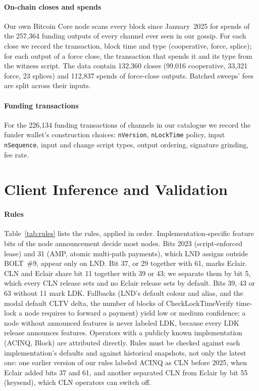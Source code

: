 \documentclass[conference]{IEEEtran}
\begin{document}
\paragraph*{On-chain closes and spends}
Our own Bitcoin Core node scans every block since January~2025 for spends of the 257,364 funding outputs of every
channel ever seen in our gossip. For each close we record the transaction, block time and type (cooperative, force,
splice); for each output of a force close, the transaction that spends it and its type from the witness script. The
data contain 132,360 closes (99,016 cooperative, 33,321 force, 23 splices) and 112,837 spends of force-close
outputs. Batched sweeps' fees are split across their inputs.

\paragraph*{Funding transactions}
For the 226,134 funding transactions of channels in our catalogue we record the funder wallet's construction
choices: \texttt{nVersion}, \texttt{nLockTime} policy, input \texttt{nSequence}, input and change script types,
output ordering, signature grinding, fee rate.

\section{Client Inference and Validation}
\label{sec:inference}

\paragraph*{Rules}
Table~\ref{tab:rules} lists the rules, applied in order. Implementation-specific feature bits of the node
announcement decide most nodes. Bits 2023 (script-enforced lease) and 31 (AMP, atomic multi-path payments), which LND
assigns outside BOLT~\#9, appear only on LND. Bit 37, or 29 together with 61, marks Eclair. CLN and Eclair share bit
11 together with 39 or 43; we separate them by bit 5, which every CLN release sets and no Eclair release sets by
default. Bits 39, 43 or 63 without 11 mark LDK. Fallbacks (LND's default colour and alias, and the modal default CLTV
delta, the number of blocks of CheckLockTimeVerify time-lock a node requires to forward a payment) yield low or
medium confidence; a node without announced features is never labeled LDK, because every LDK release announces
features. Operators with a publicly known implementation (ACINQ, Block) are attributed directly. Rules must be checked
against each implementation's defaults and against historical snapshots, not only the latest one: one earlier version
of our rules labeled ACINQ as CLN before 2025, when Eclair added bits 37 and 61, and another separated CLN from Eclair
by bit 55 (keysend), which CLN operators can switch off.
\end{document}
